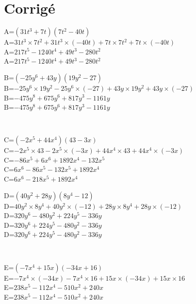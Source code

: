 \documentclass{article}%
\begin{document}
\section{Corrigé}%
\label{sec:Corrig}%
\begin{minipage}{0.5\textwidth}%
A=$(31t^3+7t)(7t^2-40t)$\\%
A=$31t^3 \times 7t^2+31t^3 \times (-40t)+7t \times 7t^2+7t \times (-40t)$\\%
A=$217t^5-1240t^4+49t^3-280t^2$\\%
A=$217t^5-1240t^4+49t^3-280t^2$\\%
\end{minipage}%
\begin{minipage}{0.5\textwidth}%
B=$(-25y^6+43y)(19y^2-27)$\\%
B=$-25y^6 \times 19y^2-25y^6 \times (-27)+43y \times 19y^2+43y \times (-27)$\\%
B=$-475y^8+675y^6+817y^3-1161y$\\%
B=$-475y^8+675y^6+817y^3-1161y$\\%
\end{minipage}%
\\%
\begin{minipage}{0.5\textwidth}%
C=$(-2x^5+44x^4)(43-3x)$\\%
C=$-2x^5 \times 43-2x^5 \times (-3x)+44x^4 \times 43+44x^4 \times (-3x)$\\%
C=$-86x^5+6x^6+1892x^4-132x^5$\\%
C=$6x^6-86x^5-132x^5+1892x^4$\\%
C=$6x^6-218x^5+1892x^4$\\%
\end{minipage}%
\begin{minipage}{0.5\textwidth}%
D=$(40y^2+28y)(8y^4-12)$\\%
D=$40y^2 \times 8y^4+40y^2 \times (-12)+28y \times 8y^4+28y \times (-12)$\\%
D=$320y^6-480y^2+224y^5-336y$\\%
D=$320y^6+224y^5-480y^2-336y$\\%
D=$320y^6+224y^5-480y^2-336y$\\%
\end{minipage}%
\\%
\begin{minipage}{0.5\textwidth}%
E=$(-7x^4+15x)(-34x+16)$\\%
E=$-7x^4 \times (-34x)-7x^4 \times 16+15x \times (-34x)+15x \times 16$\\%
E=$238x^5-112x^4-510x^2+240x$\\%
E=$238x^5-112x^4-510x^2+240x$\\%
\end{minipage}%
\end{document}
